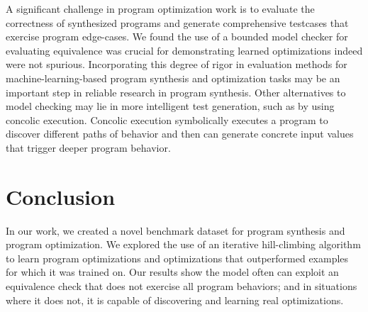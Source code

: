 \documentclass{article}
\begin{document}
A significant challenge in program optimization work is to evaluate the correctness of synthesized programs and generate comprehensive testcases that exercise program edge-cases. We found the use of a bounded model checker for evaluating equivalence was crucial for demonstrating learned optimizations indeed were not spurious. Incorporating this degree of rigor in evaluation methods for machine-learning-based program synthesis and optimization tasks may be an important step in reliable research in program synthesis. Other alternatives to model checking may lie in more intelligent test generation, such as by using concolic execution.  Concolic execution symbolically executes a program to discover different paths of behavior and then can generate concrete input values that trigger deeper program behavior. 


\section{Conclusion}

In our work, we created a novel benchmark dataset for program synthesis and program optimization. We explored the use of an iterative hill-climbing algorithm to learn program optimizations and optimizations that outperformed examples for which it was trained on. Our results show the model often can exploit an equivalence check that does not exercise all program behaviors; and in situations where it does not, it is capable of discovering and learning real optimizations. 




\end{document}
